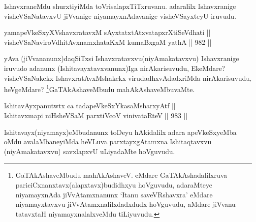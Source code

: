 \begin{artha}
IshavxraneMdu shurxtiyiMda toVrisalapxTiTxruvanu. adaralilx Ishavxranige visheVSaNatavxvU jiVvanige niyamayxnAdavanige visheVSayxteyU iruvudu.
\end{artha}


\begin{shl}
yamapeVkeSxyXVshavxratavxM sAyxtatxtAtxvatapxrXtiSeVdhati || \\
visheVSaNaviroVdhitAvxnamxhataKxM kumaBxgaM yathA \hfill || 982 ||  
\end{shl}

\begin{artha}
yAva (jiVvananunx)daqSiTxsi Ishavxratavxvu(niyAmakatavxvu) Ishavxranige iruvudo adanunx (Ishitavayxtavxvanunx)Iga nirAkarisuvudu, EkeMdare? visheVSaNakekx IshavxratAvxMshakekx virudadhxvAdadxriMda nirAkarisuvudu, heVgeMdare? \footnote[1]{GaTAkAshaveMbudu mahAkAshaveV. eMdare GaTAkAshadalilxruva pariciCxnanxtavx(alapxtavx)budidhxyu hoVguvudu, adaraMteye niyamayxnAda jiVvAtamxnanunx `Itanu saveVRshavxra' eMdare niyamayxtavxvu jiVvAtamxnalilxdadxdudx hoVguvudu, aMdare jiVvanu tatavxtaH niyamayxnalalxveMdu tiLiyuvudu.}GaTAkAshaveMbudu mahAkAshaveMbuvaMte.
\end{artha}

\begin{shl}
\footnotemark[2]IshitavAyxpanutwtx ca tadapeVkeSxYkasaMsharxyAtf || \\
Ishitavxmapi niHsheVSaM parxtiVcoV vinivataRteV \hfill || 983 ||  
\end{shl}

\begin{artha}
Ishitavayx(niyamayx)eMbudanunx toDeyu hAkidalilx adara apeVkeSxyeMba oMdu avalaMbaneyiMda heVLuva parxtayxgAtamxna Ishitaqtavxvu (niyAmakatavxvu) savxlapxvU uLiyadaMte hoVguvudu.
\end{artha}

